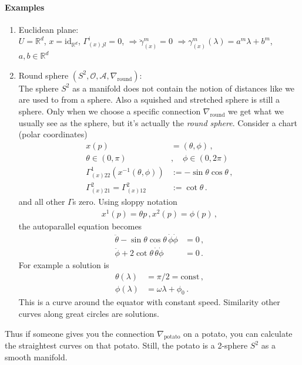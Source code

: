 \documentclass[11pt, a4paper, twocolumn]{article} %
\begin{document}
\paragraph{Examples}
\begin{enumerate}
    \item Euclidean plane:\\ $U = \mathbb{R}^d$, $x = \mathrm{id}_{\mathbb{R}^d}$, $\Gamma_(x)^{i}{}_{jl} = 0$,
        $\Rightarrow \ddot{\gamma}^m_{(x)} = 0$ $\Rightarrow \gamma_{(x)}^m(\lambda) = a^m \lambda + b^m$, $a,b\in \mathbb{R}^d$
    \item Round sphere $(S^2, \mathcal{O}, \mathcal{A}, \nabla_\text{round})$:\\
        The sphere $S^2$ as a manifold does not contain the notion of distances like we are used to from a sphere.
        Also a squished and stretched sphere is still a sphere. 
        Only when we choose a specific connection $\nabla_\text{round}$ we get what we usually see as the sphere,
        but it's actually the \textit{round sphere}.
        Consider a chart (polar coordinates)
        \begin{align}
            \nonumber x(p) &= (\theta, \phi)\,, \\
            \nonumber \theta \in (0, \pi)\,&,\quad \phi \in (0, 2\pi)\,\\
            \Gamma^1_{(x)22} (x^{-1}(\theta, \phi)) &:= - \sin\theta \cos\theta\,,\\
            \Gamma^2_{(x)21} = \Gamma^2_{(x)12} &:= \cot \theta\,.
        \end{align}
        and all other $\Gamma$s zero.
        Using sloppy notation
        \begin{align}
            x^1(p) = \theta{p}\,,
            x^2(p) = \phi(p)\,,
        \end{align}
        the autoparallel equation becomes
        \begin{align}
            \ddot \theta - \sin\theta \cos\theta\, \dot\phi \dot\phi &= 0\,,\\
            \ddot \phi + 2\cot\theta\, \dot\theta \dot\phi &= 0\,.
        \end{align}
        For example a solution is 
        \begin{align}
            \theta(\lambda) &= \pi/2 = \text{const}\,,\\
            \phi(\lambda) &= \omega \lambda + \phi_0\,.
        \end{align}
        This is a curve around the equator with constant speed.
        Similarity other curves along great circles are solutions.
\end{enumerate}
\begin{note}
    Thus if someone gives you the connection $\nabla_\text{potato}$ on a potato,
    you can calculate the straightest curves on that potato.
    Still, the potato is a 2-sphere $S^2$ as a smooth manifold.
\end{note}
\end{document}
